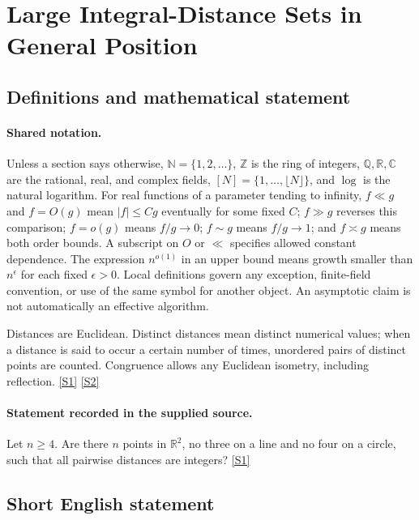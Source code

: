 \documentclass[11pt,a4paper]{article}
\newcommand{\N}{\mathbb{N}}
\newcommand{\Z}{\mathbb{Z}}
\newcommand{\Q}{\mathbb{Q}}
\newcommand{\R}{\mathbb{R}}
\newcommand{\C}{\mathbb{C}}
\newcommand{\sref}[2]{\hyperlink{source:#1:#2}{[S#2]}}
\begin{document}
\section{Large Integral-Distance Sets in General Position}\label{statement}


\subsection{Definitions and mathematical statement}

\paragraph{Shared notation.}Unless a section says otherwise, $\N=\{1,2,\ldots\}$,
$\Z$ is the ring of integers, $\Q,\R,\C$ are the rational, real, and complex
fields, $[N]=\{1,\ldots,\lfloor N\rfloor\}$, and $\log$ is the natural
logarithm. For real functions of a parameter tending to infinity,
$f\ll g$ and $f=O(g)$ mean $|f|\leq Cg$ eventually for some fixed $C$;
$f\gg g$ reverses this comparison; $f=o(g)$ means $f/g\to0$;
$f\sim g$ means $f/g\to1$; and $f\asymp g$ means both order bounds.
A subscript on $O$ or $\ll$ specifies allowed constant dependence.
The expression $n^{o(1)}$ in an upper bound means growth smaller than
$n^\epsilon$ for each fixed $\epsilon>0$. Local definitions govern any
exception, finite-field convention, or use of the same symbol for another
object. An asymptotic claim is not automatically an effective algorithm.



Distances are Euclidean. Distinct distances mean distinct numerical values; when a distance is said to occur a certain number of times, unordered pairs of distinct points are counted. Congruence allows any Euclidean isometry, including reflection. \sref{statement}{1} \sref{statement}{2}

\paragraph{Statement recorded in the supplied source.}
Let $n\geq 4$. Are there $n$ points in $\mathbb{R}^2$, no three on a line and no four on a circle, such that all pairwise distances are integers? \sref{statement}{1}

\subsection{Short English statement}
\end{document}
